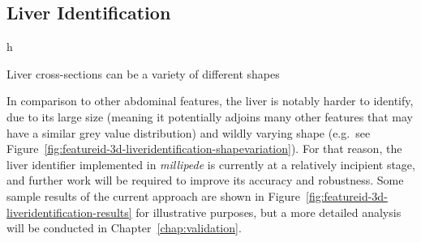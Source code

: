 \afterpage{\clearpage}
\newpage

\subsection{Liver Identification}

\begin{stusubfig}{h}
	\hspace{4mm}%
	\hspace{4mm}%
\caption{Liver cross-sections can be a variety of different shapes}
\label{fig:featureid-3d-liveridentification-shapevariation}
\end{stusubfig}

\noindent In comparison to other abdominal features, the liver is notably harder to identify, due to its large size (meaning it potentially adjoins many other features that may have a similar grey value distribution) and wildly varying shape (e.g.~see Figure~\ref{fig:featureid-3d-liveridentification-shapevariation}). For that reason, the liver identifier implemented in \emph{millipede} is currently at a relatively incipient stage, and further work will be required to improve its accuracy and robustness. Some sample results of the current approach are shown in Figure~\ref{fig:featureid-3d-liveridentification-results} for illustrative purposes, but a more detailed analysis will be conducted in Chapter~\ref{chap:validation}.

